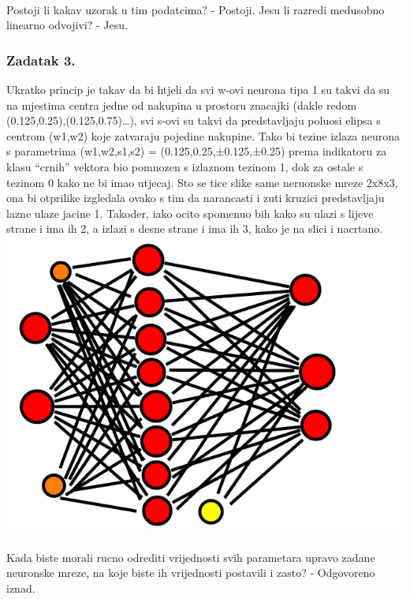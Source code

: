 \documentclass{article}
\begin{document}
    \begin{center}
    \end{center}
    { \hspace*{\fill} \\}
    
    Postoji li kakav uzorak u tim podatcima? - Postoji.
Jesu li razredi medusobno linearno odvojivi? - Jesu.

    \subsubsection{Zadatak 3.}\label{zadatak-3.}

    Ukratko princip je takav da bi htjeli da svi w-ovi neurona tipa 1 su
takvi da su na mjestima centra jedne od nakupina u prostoru znacajki
(dakle redom (0.125,0.25),(0.125,0.75)\ldots{}), svi s-ovi su takvi da
predstavljaju poluosi elipsa s centrom (w1,w2) koje zatvaraju pojedine
nakupine. Tako bi tezine izlaza neurona s parametrima (w1,w2,s1,s2) =
(0.125,0.25,±0.125,±0.25) prema indikatoru za klasu ``crnih'' vektora
bio pomnozen s izlaznom tezinom 1, dok za ostale s tezinom 0 kako ne bi
imao utjecaj. Sto se tice slike same neruonske mreze 2x8x3, ona bi
otprilike izgledala ovako s tim da narancasti i zuti kruzici
predstavljaju lazne ulaze jacine 1. Takoder, iako ocito spomenuo bih
kako su ulazi s lijeve strane i ima ih 2, a izlazi s desne strane i ima
ih 3, kako je na slici i nacrtano. \includegraphics{neuralka.png}

    Kada biste morali rucno odrediti vrijednosti svih parametara upravo
zadane neuronske mreze, na koje biste ih vrijednosti postavili i zasto?
- Odgovoreno iznad.
\end{document}
